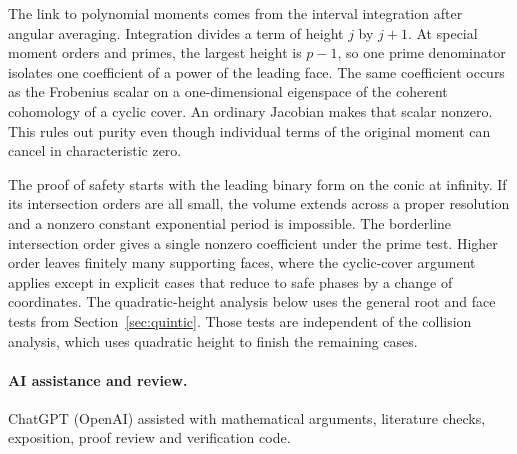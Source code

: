 \documentclass[11pt]{article}
\begin{document}
The link to polynomial moments comes from the interval integration after
angular averaging. Integration divides a term of height \(j\) by \(j+1\).
At special moment orders and primes, the largest height is \(p-1\), so
one prime denominator isolates one coefficient of a power of the leading
face. The same coefficient occurs as the Frobenius scalar on a
one-dimensional eigenspace of the coherent cohomology of a cyclic cover.
An ordinary Jacobian makes that scalar nonzero. This rules out purity even
though individual terms of the original moment can cancel in
characteristic zero.

The proof of safety starts with the leading binary form on the conic at
infinity. If its intersection orders are all small, the volume extends
across a proper resolution and a nonzero constant exponential period is
impossible. The borderline intersection order gives a single nonzero
coefficient under the prime test. Higher order leaves finitely many
supporting faces, where the cyclic-cover argument applies except in
explicit cases that reduce to safe phases by a change of coordinates.
The quadratic-height analysis below uses the general root and face tests
from Section~\ref{sec:quintic}. Those tests are independent of the collision
analysis, which uses quadratic height to finish the remaining cases.






\paragraph{AI assistance and review.}
ChatGPT (OpenAI) assisted with mathematical arguments, literature checks,
exposition, proof review and verification code.
\end{document}
